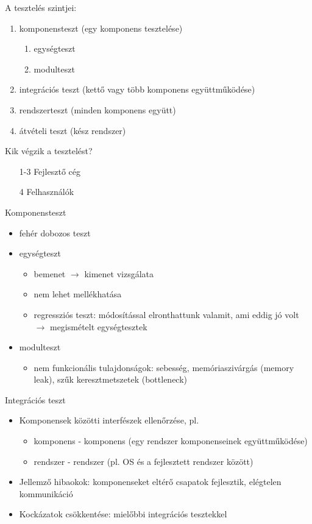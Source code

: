 \begin{frame}
  A tesztelés szintjei:
  \begin{enumerate}
    \item komponensteszt (egy komponens tesztelése)
    \begin{enumerate}
      \renewcommand{\theenumii}{\alph{enumii}}
      \item egységteszt
      \item modulteszt
    \end{enumerate}
    \item integrációs teszt (kettő vagy több komponens együttműködése)
    \item rendszerteszt (minden komponens együtt)
    \item átvételi teszt (kész rendszer)
  \end{enumerate}
\end{frame}

\begin{frame}
  Kik végzik a tesztelést?
  \begin{itemize}
    \item[1-3] Fejlesztő cég
    \item[4] Felhasználók
  \end{itemize}
  Komponensteszt
  \begin{itemize}
    \item fehér dobozos teszt
    \item egységteszt
    \begin{itemize}
      \item bemenet $\to$ kimenet vizsgálata
      \item nem lehet mellékhatása
      \item regressziós teszt: módosítással elronthattunk valamit, ami eddig jó volt $\to$ megismételt egységtesztek
    \end{itemize}
    \item modulteszt
    \begin{itemize}
      \item nem funkcionális tulajdonságok: sebesség, memóriaszivárgás (memory leak), szűk keresztmetszetek (bottleneck)
    \end{itemize}
  \end{itemize}
\end{frame}

\begin{frame}
  Integrációs teszt
  \begin{itemize}
    \item Komponensek közötti interfészek ellenőrzése, pl.
    \begin{itemize}
      \item komponens - komponens (egy rendszer komponenseinek együttműködése)
      \item rendszer - rendszer (pl. OS és a fejlesztett rendszer között)
    \end{itemize}
    \item Jellemző hibaokok: komponenseket eltérő csapatok fejlesztik, elégtelen kommunikáció
    \item Kockázatok csökkentése: mielőbbi integrációs tesztekkel
  \end{itemize}
\end{frame}

